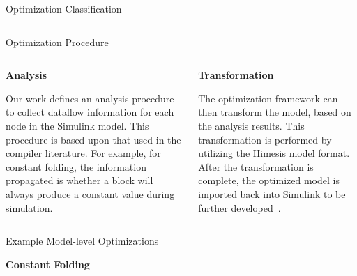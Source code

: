 \documentclass[final,hyperref={pdfpagelabels=false}]{beamer}
\begin{document}
\begin{frame}{}
\begin{block}{Optimization Classification}
\begin{columns}[t,totalwidth=\linewidth]
                  \end{columns}
            \end{block}
	
        \begin{block}{Optimization Procedure}
        \vspace{-1.5cm}
        \begin{columns}[t,totalwidth=\linewidth]
         \begin{column}{.485\linewidth}
         \vspace{-.8cm}
         \small
       \begin{center}\textbf{Analysis}\end{center}
       \footnotesize
       Our work defines an analysis procedure to collect dataflow information for each node in the Simulink model. This procedure is based upon that used in the compiler literature. For example, for constant folding, the information propagated is whether a block will always produce a constant value during simulation.
       \end{column}
       \begin{column}{.485\linewidth}
       \vspace{-.8cm}
       \small
      \begin{center}\textbf{Transformation}\end{center}
        \footnotesize
        The optimization framework can then transform the model, based on the analysis results. This transformation is performed by utilizing the Himesis model format. After the transformation is complete, the optimized model is imported back into Simulink to be further developed~\cite{Denil}.
        \end{column}
              \end{columns}
        \end{block}
      
      \vspace{-1.5cm}
    \begin{columns}[t,totalwidth=\linewidth]
    \centering
      \begin{column}{.585\linewidth}
        \begin{block}{Example Model-level Optimizations}
         \vspace{-.8cm}
        \small
        \begin{center}\textbf{Constant Folding}\end{center}
        \vspace{-0.3cm}
        \begin{columns}[c,totalwidth=\linewidth]
        \begin{column}{.485\linewidth}
        \begin{center}
        

\end{center}
\end{column}
\end{columns}
\end{block}
\end{column}
\end{columns}
\end{frame}
\end{document}
